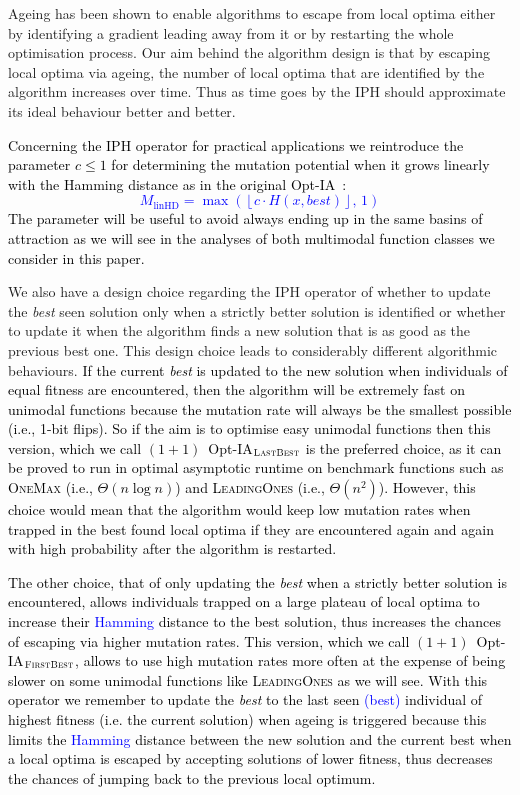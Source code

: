 \documentclass[lettersize,journal]{IEEEtran}
\newcommand{\rev}[1]{\textcolor{blue}{#1}}
\begin{document}
 Ageing has been shown to enable algorithms to escape from local optima either by identifying a gradient leading away from it or by restarting the whole optimisation process. Our aim behind the algorithm design is that by escaping local optima via ageing, the number of local optima that are identified by the algorithm increases over time. Thus as time goes by the IPH should approximate its ideal behaviour better and better.
 
\textcolor{black}{Concerning the IPH operator for practical applications we  reintroduce the parameter $c\leq 1$ for determining the mutation potential when it grows linearly with the Hamming distance as in the original Opt-IA~\cite{JansenZarges2011}:}  
 \textcolor{blue}{
 $$M_{\text{linHD}} = \max\!\left(\left\lfloor c \cdot H(x,\mathit{best}) \right\rfloor,\, 1 \right)$$
 }
\textcolor{black}{The parameter will be useful to avoid always ending up in the same basins of attraction as we will see in the analyses of both multimodal function classes we consider in this paper.} 
 
{\color{black} We also have  a design choice regarding the IPH operator  of whether to update the {\it best} seen solution only when a strictly better solution is identified or whether to update it when the algorithm finds a new solution that is as good as the previous best one. 
This design choice leads to considerably different algorithmic behaviours.}
\textcolor{black}{If the current {\it best} is updated to the new solution when individuals of equal fitness are encountered,  then the algorithm will be extremely fast on unimodal functions because the mutation rate will always be the smallest possible (i.e., 1-bit flips). So if the aim is to optimise easy unimodal functions then this version, which we call $(1+1)$~Opt-IA$_{\textsc{LastBest}}$ is the preferred choice, as it can be proved to run in optimal asymptotic runtime on benchmark functions such as \textsc{OneMax} (i.e., $\Theta(n \log n)$) and \textsc{LeadingOnes} (i.e., $\Theta(n^2)$). However, this choice would mean that the algorithm would keep low mutation rates when trapped in the best found local optima if they are encountered again and again with high probability after the algorithm is restarted.}

\textcolor{black}{
The other choice, that of only updating the {\it best} when a strictly better solution is encountered, allows individuals trapped on a large plateau of local optima to increase their \rev{Hamming} distance to the best solution, thus increases the chances of escaping via higher mutation rates. This version, which we call $(1+1)$~Opt-IA$_{\textsc{FirstBest}}$, allows to use high mutation rates more often at the expense of being slower on some unimodal functions like \textsc{LeadingOnes} as we will see. With this operator we remember to update the {\it best} to the last seen \rev{(best)} individual of highest fitness (i.e. the current solution) when ageing is triggered because this limits the \rev{Hamming} distance between the new solution and the current best when a local optima is escaped by accepting solutions of lower fitness, thus decreases the chances of jumping back to the previous local optimum.}
 	
\end{document}
